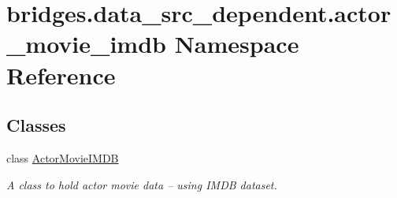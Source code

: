 \hypertarget{namespacebridges_1_1data__src__dependent_1_1actor__movie__imdb}{}\section{bridges.\+data\+\_\+src\+\_\+dependent.\+actor\+\_\+movie\+\_\+imdb Namespace Reference}
\label{namespacebridges_1_1data__src__dependent_1_1actor__movie__imdb}
\subsection*{Classes}
\begin{DoxyCompactItemize}
\item 
class \mbox{\hyperlink{classbridges_1_1data__src__dependent_1_1actor__movie__imdb_1_1_actor_movie_i_m_d_b}{Actor\+Movie\+I\+M\+DB}}
\begin{DoxyCompactList}\small\item\em A class to hold actor movie data -- using I\+M\+DB dataset. \end{DoxyCompactList}\end{DoxyCompactItemize}
